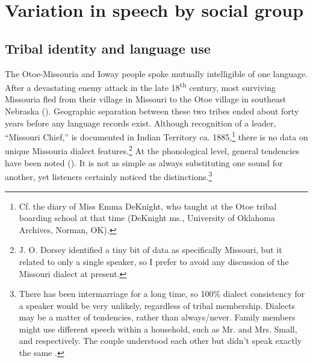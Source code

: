 \documentclass[output=paper]{LSP/langsci}
\begin{document}
\section{Variation in speech by social group}
\subsection{Tribal identity and language use} 	The Otoe-Missouria and Ioway people spoke mutually intelligible  of one language.  After a devastating enemy attack in the late 18\textsuperscript{th} century, most surviving Missouria fled from their village in Missouri to the Otoe village in southeast Nebraska (\citealt{Schweitzer2001}).  Geographic separation between these two tribes ended about forty years before any language records exist.  Although recognition of a leader, ``Missouri Chief,'' is documented in Indian Territory ca. 1885,\footnote{Cf. the diary of Miss Emma DeKnight, who taught at the Otoe tribal boarding school at that time (DeKnight ms., University of Oklahoma Archives, Norman, OK).}  there is no data on unique Missouria dialect features.\footnote{J. O. Dorsey identified a tiny bit of data as specifically Missouri, but it related to only a single speaker, so I prefer to avoid any discussion of the Missouri dialect at present.}  At the phonological level, general tendencies have been noted (). It is not as simple as always substituting one sound for another, yet listeners certainly noticed the distinctions.\footnote{There has been intermarriage for a long time, so 100\% dialect consistency for a speaker would be very unlikely, regardless of tribal membership. Dialects may be a matter of tendencies, rather than always/never. Family members might use different speech within a household, such as Mr. and Mrs. Small,  and  respectively. The couple understood each other but didn't speak exactly the same \citep{Marsh1936}.}	
\end{document}
